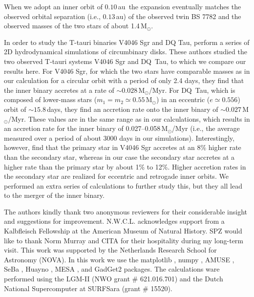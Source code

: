 \documentclass[twocolumn]{aastex62}
\newcommand{\MSun}{\mbox{M$_\odot$}}
\providecommand{\DIFadd}[1]{{\protect\color{blue}\uwave{#1}}} %
\providecommand{\DIFaddbegin}{} %
\providecommand{\DIFaddend}{} %
\begin{document}
When we adopt an inner orbit of $0.10$\,au\, the expansion eventually
matches the observed orbital separation (i.e., $0.13$\,au) of the
observed twin BS \DIFaddbegin \DIFadd{WOCS }\DIFaddend 7782 and the observed masses of the two stars of
about 1.4\,\MSun.

In order to study the T-tauri binaries V4046 Sgr and DQ Tau,
\cite{2011MNRAS.413.2679D} perform a series of 2D hydrodynamical
simulations of circumbinary disks.  These authors studied the two
observed T-tauri systems V4046 Sgr and DQ~Tau, to which we compare our
results here.  For V4046 Sgr, for which the two stars have comparable
masses as in our calculation for a circular orbit with a period of
only 2.4 days, they find that the inner binary accretes at a rate of
$\sim 0.028$\,\MSun/Myr.  For DQ~Tau, which is composed of lower-mass
stars ($m_1 = m_2 \simeq 0.55$\,\MSun) in an eccentric ($e\simeq              
0.556$) orbit of $\sim 15.8$\,days, they find an accretion rate onto
the inner binary of $\sim 0.027$\,\MSun/Myr.  These values are in the
same range as in our calculations, which results in an accretion rate
for the inner binary of 0.027--0.058\,\MSun/Myr (i.e., the average
measured over a period of about 3000 days in our simulations).
Interestingly, however, \cite{2011MNRAS.413.2679D} find that the
primary star in V4046 Sgr accretes at an 8\% higher rate than the
secondary star, whereas in our case the secondary star accretes at a
higher rate than the primary star by about 1\% to 12\%.  Higher
accretion rates in the secondary star are realized for eccentric and
retrogade inner orbits. We performed an extra series of calculations
to further study this, but they all lead to the merger of the inner
binary.




\acknowledgments

The authors kindly thank two anonymous reviewers for their considerable insight and 
suggestions for improvement.  N.W.C.L. acknowledges support from a Kalbfleisch Fellowship at the
American Museum of Natural History.  SPZ would like to thank Norm
Murray and CITA for their hospitality during my long-term visit.  This
work was supported by the Netherlands Research School for Astronomy
(NOVA). 
In this work we use the matplotlib
\citep{2007CSE.....9...90H}, numpy
\citep{Oliphant2006ANumPy}, AMUSE
\citep{portegies_zwart_simon_2018_1443252}, SeBa
\citep{2012ascl.soft01003P}, Huayno \citep{2012NewA...17..711P}, MESA
\citep{2010ascl.soft10083P}, and GadGet2 \citep{2000ascl.soft03001S}
packages. The calculations ware performed using the LGM-II (NWO grant
\# 621.016.701) and the Dutch National Supercomputer at SURFSara
(grant \# 15520).





%
% 
%      
\end{document}
